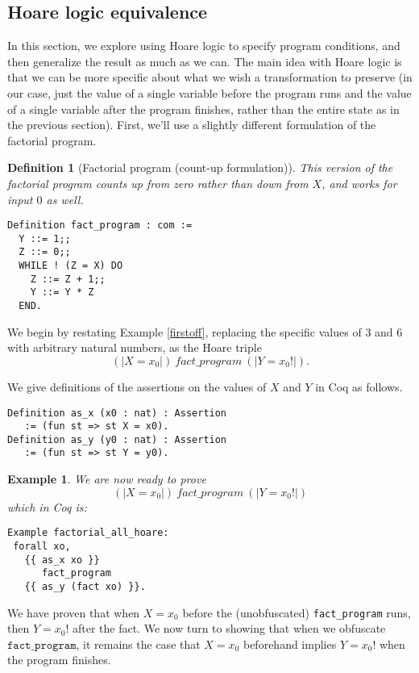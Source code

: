 \documentclass[compsoc,conference,a4paper,10pt,times]{IEEEtran}
\newtheorem{defin}[theorem]{Definition}
\newtheorem{example}[theorem]{Example}
\begin{document}
\subsection{Hoare logic equivalence}\label{hoarequiv}

In this section, we explore using Hoare logic to specify program conditions, and then generalize the result as much as we can.  The main idea with Hoare logic is that we can be more specific about what we wish a transformation to preserve (in our case, just the value of a single variable before the program runs and the value of a single variable after the program finishes, rather than the entire state as in the previous section).  First, we'll use a slightly different formulation of the factorial program.

\begin{defin}[Factorial program (count-up formulation)]
This version of the factorial program counts up from zero rather than down from $X$, and works for input $0$ as well.
\begin{verbatim}
Definition fact_program : com :=
  Y ::= 1;;
  Z ::= 0;;
  WHILE ! (Z = X) DO
    Z ::= Z + 1;;
    Y ::= Y * Z
  END.
\end{verbatim}
\end{defin}

We begin by restating Example \ref{firstoff}, replacing the specific values of $3$ and $6$ with arbitrary natural numbers, as the Hoare triple
\[
    (| X = x_0 |)\ fact\_program\ (| Y = x_0! |).
\]

We give definitions of the assertions on the values of $X$ and $Y$ in Coq as follows.

\begin{verbatim}
Definition as_x (x0 : nat) : Assertion 
   := (fun st => st X = x0).
Definition as_y (y0 : nat) : Assertion 
   := (fun st => st Y = y0).
\end{verbatim}

\begin{example}\label{hoareexample1}
    We are now ready to prove
    \[
     (|X=x_0|)\ fact\_program\ (|Y=x_0!|)
    \]
which in Coq is:
    \begin{verbatim}
Example factorial_all_hoare: 
 forall xo,
   {{ as_x xo }} 
      fact_program 
   {{ as_y (fact xo) }}.
  \end{verbatim}
\end{example}
 
 We have proven that when $X = x_0$ before the (unobfuscated) \texttt{fact\_program} runs, then $Y = x_0!$ after the fact.  We now turn to showing that when we obfuscate $\texttt{fact\_program}$, it remains the case that $X = x_0$ beforehand implies $Y = x_0!$ when the program finishes.
\end{document}
